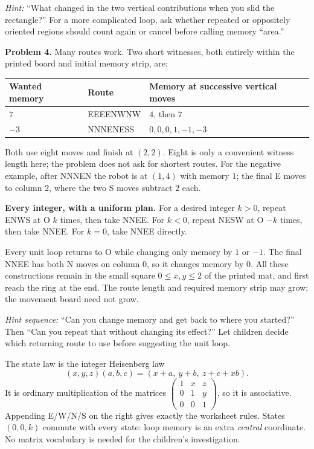 \documentclass[11pt,letterpaper]{article}
\newcommand{\sectiontitle}[1]{\par\vspace{4pt}{\large\bfseries #1}\par}
\newcommand{\answer}[1]{\par\vspace{3pt}\textbf{Problem #1.} }
\begin{document}
\textit{Hint:} ``What changed in the two vertical contributions when you slid the rectangle?'' For a more complicated loop, ask whether repeated or oppositely oriented regions should count again or cancel before calling memory ``area.''
\newpage
\sectiontitle{Controlling memory and the deeper connection}
\answer{4} Many routes work. Two short witnesses, both entirely within the printed board and initial memory strip, are:
\begin{center}\renewcommand{\arraystretch}{1.25}
\begin{tabular}{@{}lll@{}}
Wanted memory & Route & Memory at successive vertical moves\\\hline
$7$ & EEEENWNW & $4$, then $7$\\
$-3$ & NNNENESS & $0,0,0,1,-1,-3$
\end{tabular}\end{center}
Both use eight moves and finish at $(2,2)$. Eight is only a convenient witness length here; the problem does not ask for shortest routes. For the negative example, after NNNEN the robot is at $(1,4)$ with memory $1$; the final E moves to column $2$, where the two S moves subtract $2$ each.

\textbf{Every integer, with a uniform plan.} For a desired integer $k>0$, repeat ENWS at O $k$ times, then take NNEE. For $k<0$, repeat NESW at O $-k$ times, then take NNEE. For $k=0$, take NNEE directly.

Every unit loop returns to O while changing only memory by $1$ or $-1$. The final NNEE has both N moves on column $0$, so it changes memory by $0$. All these constructions remain in the small square $0\leq x,y\leq2$ of the printed mat, and first reach the ring at the end. The route length and required memory strip may grow; the movement board need not grow.

\textit{Hint sequence:} ``Can you change memory and get back to where you started?'' Then ``Can you repeat that without changing its effect?'' Let children decide which returning route to use before suggesting the unit loop.

\sectiontitle{Adult mathematical extension}
The state law is the integer Heisenberg law
\[
(x,y,z)(a,b,c)=(x+a,\ y+b,\ z+c+xb).
\]
It is ordinary multiplication of the matrices
$\left(\begin{smallmatrix}1&x&z\\0&1&y\\0&0&1\end{smallmatrix}\right)$,
so it is associative. Appending E/W/N/S on the right gives exactly the worksheet rules. States $(0,0,k)$ commute with every state: loop memory is an extra \emph{central} coordinate. No matrix vocabulary is needed for the children's investigation.
\end{document}
